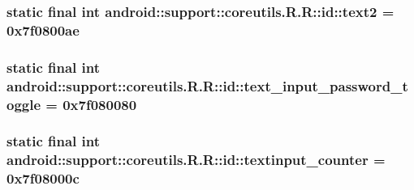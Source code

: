 \hypertarget{classandroid_1_1support_1_1coreutils_1_1_r_1_1id_c18775629b6e3492d6d38a7e275356f4}{
\subsubsection[{text2}]{\setlength{\rightskip}{0pt plus 5cm}static final int android::support::coreutils.R.R::id::text2 = 0x7f0800ae}}
\label{classandroid_1_1support_1_1coreutils_1_1_r_1_1id_c18775629b6e3492d6d38a7e275356f4}


\hypertarget{classandroid_1_1support_1_1coreutils_1_1_r_1_1id_96c68b4aecec630507ac0031b9da6ff3}{
\subsubsection[{text\_\-input\_\-password\_\-toggle}]{\setlength{\rightskip}{0pt plus 5cm}static final int android::support::coreutils.R.R::id::text\_\-input\_\-password\_\-toggle = 0x7f080080}}
\label{classandroid_1_1support_1_1coreutils_1_1_r_1_1id_96c68b4aecec630507ac0031b9da6ff3}


\hypertarget{classandroid_1_1support_1_1coreutils_1_1_r_1_1id_d81015672633d3d9361aeea1732236d3}{
\subsubsection[{textinput\_\-counter}]{\setlength{\rightskip}{0pt plus 5cm}static final int android::support::coreutils.R.R::id::textinput\_\-counter = 0x7f08000c}}
\label{classandroid_1_1support_1_1coreutils_1_1_r_1_1id_d81015672633d3d9361aeea1732236d3}


